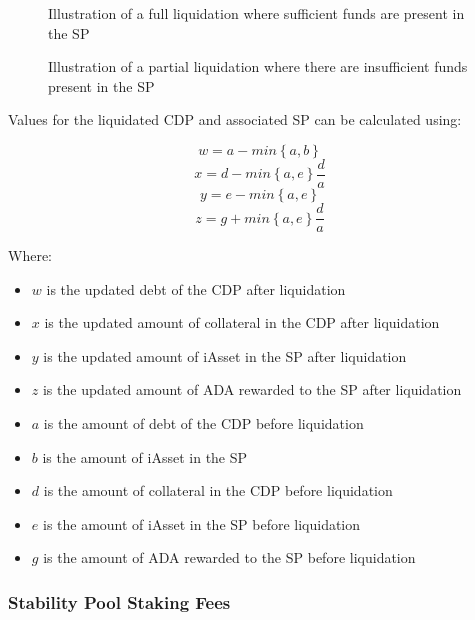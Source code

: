 \documentclass{article}
\begin{document}
\begin{sloppypar}
\hypertarget{spl-figure}{%
\begin{figure}[htbp]
\centering

\caption{Illustration of a full liquidation where sufficient funds are
present in the SP}
\label{spl-figure}
\end{figure}}

\hypertarget{partial-spl-figure}{%
\begin{figure}[htbp]
\centering

\caption{Illustration of a partial liquidation where there are
insufficient funds present in the SP}
\label{partial-spl-figure}
\end{figure}}

\filbreak

Values for the liquidated CDP and associated SP can be calculated using:

\[w = a - min\left\{ a,b \right\}\]
\[x = d - min\left\{ a,e \right\}\frac{d}{a}\]
\[y = e - min\left\{ a,e \right\}\]
\[z = g + min\left\{ a,e \right\}\frac{d}{a}\]

Where:

\begin{itemize}
\item
  \(w\) is the updated debt of the CDP after liquidation
\item
  \(x\) is the updated amount of collateral in the CDP after liquidation
\item
  \(y\) is the updated amount of iAsset in the SP after liquidation
\item
  \(z\) is the updated amount of ADA rewarded to the SP after
  liquidation
\item
  \(a\) is the amount of debt of the CDP before liquidation
\item
  \(b\) is the amount of iAsset in the SP
\item
  \(d\) is the amount of collateral in the CDP before liquidation
\item
  \(e\) is the amount of iAsset in the SP before liquidation
\item
  \(g\) is the amount of ADA rewarded to the SP before liquidation
\end{itemize}

\hypertarget{stability-pool-staking-fees}{%
\subsubsection{Stability Pool Staking
Fees}\label{stability-pool-staking-fees}}


\end{sloppypar}
\end{document}
